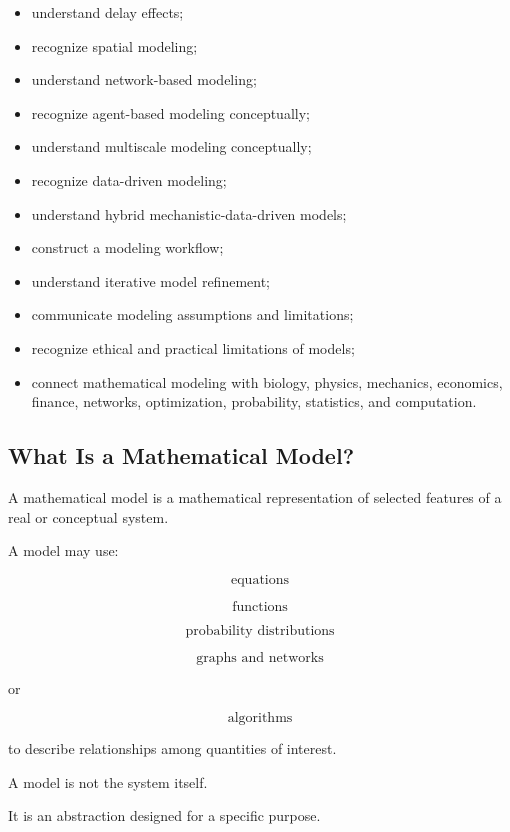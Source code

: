 {\begin{itemize}
    \item understand delay effects;
    \item recognize spatial modeling;
    \item understand network-based modeling;
    \item recognize agent-based modeling conceptually;
    \item understand multiscale modeling conceptually;
    \item recognize data-driven modeling;
    \item understand hybrid mechanistic-data-driven models;
    \item construct a modeling workflow;
    \item understand iterative model refinement;
    \item communicate modeling assumptions and limitations;
    \item recognize ethical and practical limitations of models;
    \item connect mathematical modeling with biology, physics, mechanics,
          economics, finance, networks, optimization, probability,
          statistics, and computation.
\end{itemize}
}

\subsection{What Is a Mathematical Model?}
\label{subsec:what-is-mathematical-model}

A mathematical model is a mathematical representation of selected features
of a real or conceptual system.

A model may use:

\[
\boxed{
\text{equations}
}
\]

\[
\boxed{
\text{functions}
}
\]

\[
\boxed{
\text{probability distributions}
}
\]

\[
\boxed{
\text{graphs and networks}
}
\]

or

\[
\boxed{
\text{algorithms}
}
\]

to describe relationships among quantities of interest.

A model is not the system itself.

It is an abstraction designed for a specific purpose.

